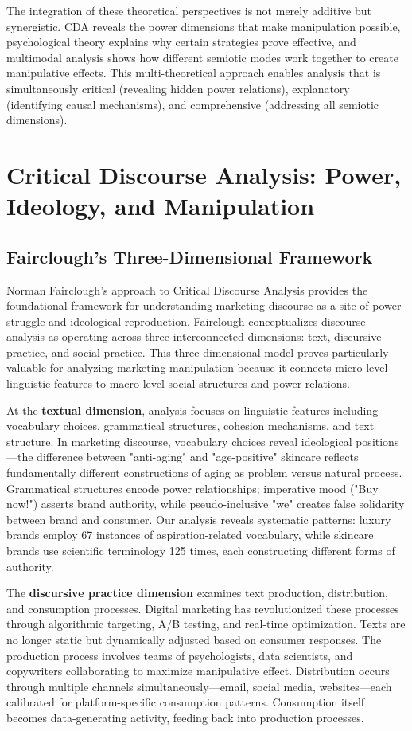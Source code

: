 The integration of these theoretical perspectives is not merely additive but synergistic. CDA reveals the power dimensions that make manipulation possible, psychological theory explains why certain strategies prove effective, and multimodal analysis shows how different semiotic modes work together to create manipulative effects. This multi-theoretical approach enables analysis that is simultaneously critical (revealing hidden power relations), explanatory (identifying causal mechanisms), and comprehensive (addressing all semiotic dimensions).

\section{Critical Discourse Analysis: Power, Ideology, and Manipulation}
\label{sec:cda_theory}

\subsection{Fairclough's Three-Dimensional Framework}

Norman Fairclough's approach to Critical Discourse Analysis provides the foundational framework for understanding marketing discourse as a site of power struggle and ideological reproduction. Fairclough conceptualizes discourse analysis as operating across three interconnected dimensions: text, discursive practice, and social practice. This three-dimensional model proves particularly valuable for analyzing marketing manipulation because it connects micro-level linguistic features to macro-level social structures and power relations.

At the \textbf{textual dimension}, analysis focuses on linguistic features including vocabulary choices, grammatical structures, cohesion mechanisms, and text structure. In marketing discourse, vocabulary choices reveal ideological positions—the difference between "anti-aging" and "age-positive" skincare reflects fundamentally different constructions of aging as problem versus natural process. Grammatical structures encode power relationships; imperative mood ("Buy now!") asserts brand authority, while pseudo-inclusive "we" creates false solidarity between brand and consumer. Our analysis reveals systematic patterns: luxury brands employ 67 instances of aspiration-related vocabulary, while skincare brands use scientific terminology 125 times, each constructing different forms of authority.

The \textbf{discursive practice dimension} examines text production, distribution, and consumption processes. Digital marketing has revolutionized these processes through algorithmic targeting, A/B testing, and real-time optimization. Texts are no longer static but dynamically adjusted based on consumer responses. The production process involves teams of psychologists, data scientists, and copywriters collaborating to maximize manipulative effect. Distribution occurs through multiple channels simultaneously—email, social media, websites—each calibrated for platform-specific consumption patterns. Consumption itself becomes data-generating activity, feeding back into production processes.

